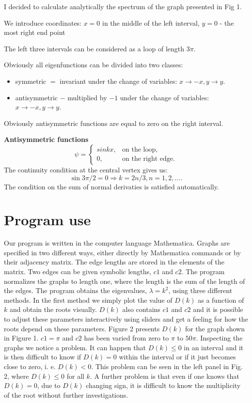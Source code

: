 \documentclass[a4paper]{article}
\begin{document}
I decided to calculate analytically the spectrum of the graph presented in Fig 1.

We introduce coordinates: $ x= 0 $ in the middle of the left interval, $y= 0$ - the most right end point

The left three intervals can be considered as a loop of length $ 3 \pi$.

Obviously all eigenfunctions can be divided into two classes:

\begin{itemize}

\item symmetric $ = $ invariant under the change of variables: $ x \rightarrow - x, y \rightarrow y. $

\item antisymmetric $ - $ multiplied by $ -1 $ under the change of variables: $ x \rightarrow - x, y \rightarrow y. $
  \end{itemize}

Obviously antisymmetric functions are equal to zero on the right interval.

{\bf Antisymmetric functions}
$$
\psi = \left\{
\begin{array}{cc}
sin kx, &\mbox{on the loop,}\\
0, & \mbox{on the right edge.}
\end{array} \right. $$
The continuity condition at the central vertex gives us:
$$\sin 3 \pi/2 = 0  \Rightarrow k = 2 n/3, n = 1,2, \dots .$$
The condition on the sum of normal derivaties is satisfied automatically.


\section{Program use}





Our program is written in the computer language Mathematica. Graphs are specified in two different ways, either directly by Mathematica commands or by their adjacency matrix. The edge lengths are stored in the elements of the matrix. Two edges can be given symbolic lengths, $c1$ and $c2$. The program normalizes the graphs to length one, where the length is the sum of the length of the edges. The program obtains the eigenvalues, $\lambda=k^2$, using three different methods. In the first method we simply plot the value of $D(k)$ as a function of $k$ and obtain the roots visually. $D(k)$ also contains $c1$ and $c2$ and it is possible to adjust these parameters interactively using sliders and get a feeling for how the roots depend on these parameters. Figure 2 presents $D(k)$ for the graph shown in Figure 1. $c1=\pi$ and $c2$ has been varied from zero to $\pi$ to $50\pi$. Inspecting the graphs we notice a problem. It can happen that $D(k)\leq 0$ in an interval and it is then difficult to know if  $D(k)=0$ within the interval or if it just becomes close to zero, i. e. $D(k) < 0$. This problem can be seen in the left panel in Fig. 2, where $D(k) \leq 0$ for all $k$. A further problem is that even if one knows that $D(k)=0$, due to  $D(k)$ changing sign, it is difficult to know the multiplicity of the root without further investigations.
\end{document}
